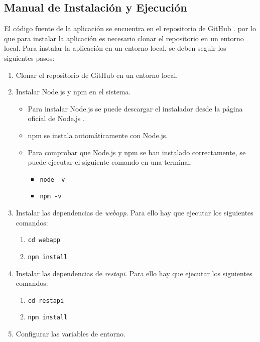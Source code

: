 \subsection{Manual de Instalación y Ejecución}
El código fuente de la aplicación se encuentra en el repositorio de GitHub .
por lo que para instalar la aplicación es necesario clonar el repositorio en un entorno local.
Para instalar la aplicación en un entorno local, se deben seguir los siguientes pasos:
\begin{enumerate}
    \item Clonar el repositorio de GitHub en un entorno local.
    \item Instalar Node.js y npm en el sistema.
    \begin{itemize}
        \item Para instalar Node.js se puede descargar el instalador desde la página oficial de Node.js .
        \item npm se instala automáticamente con Node.js.
        \item Para comprobar que Node.js y npm se han instalado correctamente, se puede ejecutar el siguiente comando en una terminal:
        \begin{itemize}
            \item \texttt{node -v}
            \item \texttt{npm -v}
        \end{itemize}
    \end{itemize}
    \item Instalar las dependencias de \textit{webapp}. Para ello hay que ejecutar los siguientes comandos:
    \begin{enumerate}
        \item \texttt{cd webapp}
        \item \texttt{npm install}
    \end{enumerate}
    \item Instalar las dependencias de \textit{restapi}. Para ello hay que ejecutar los siguientes comandos:
    \begin{enumerate}
        \item \texttt{cd restapi}
        \item \texttt{npm install}
    \end{enumerate}
    \item Configurar las variables de entorno.

\end{enumerate}

